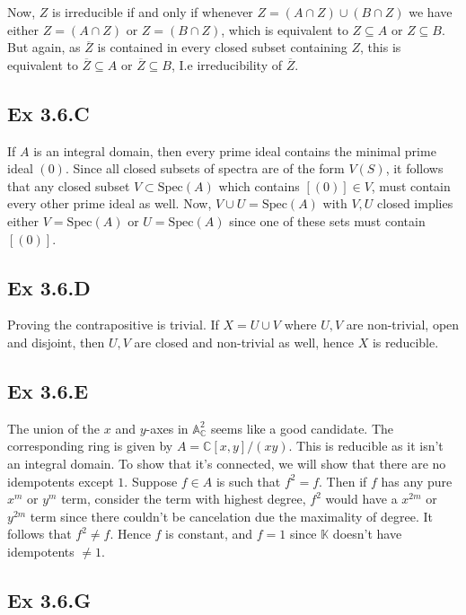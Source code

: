 \documentclass{article}
\theoremstyle{definition}
\newcommand{\C}{\mathbb{C}}
\newcommand{\K}{\mathbb{K}}
\newcommand{\A}{\mathbb{A}}
\newcommand{\Spec}{\text{Spec}}
\begin{document}
Now, $Z$ is irreducible if and only if whenever $Z = (A \cap Z) \cup (B \cap Z)$ 
we have either $Z = (A \cap Z)$ or $Z = (B \cap Z)$, which is equivalent to 
$Z \subseteq A$ or $Z \subseteq B$. But again, as $\overline{Z}$ is contained 
in every closed subset containing $Z$, this is equivalent to $\overline{Z} \subseteq A$ 
or $\overline{Z} \subseteq B$, I.e irreducibility of $\overline{Z}$.

\subsection*{Ex 3.6.C}

If $A$ is an integral domain, then every prime ideal contains the minimal prime
ideal $(0)$. Since all closed subsets of spectra are of the form $V(S)$, it
follows that any closed subset $V \subset \Spec(A)$ which contains $[(0)] \in
V$, must contain every other prime ideal as well. Now, $V \cup U = \Spec(A)$
with $V, U$ closed implies either $V = \Spec(A)$ or $U = \Spec(A)$ since one of
these sets must contain $[(0)]$.

\subsection*{Ex 3.6.D}

Proving the contrapositive is trivial. If $X = U \cup V$ where $U, V$ are
non-trivial, open and disjoint, then $U, V$ are closed and non-trivial as well,
hence $X$ is reducible.

\subsection*{Ex 3.6.E}

The union of the $x$ and $y$-axes in $\A^2_{\C}$ seems like a good candidate.
The corresponding ring is given by $A = \C[x, y]/(xy)$. This is reducible as it
isn't an integral domain. To show that it's connected, we will show that there
are no idempotents except $1$. Suppose $f \in A$ is such that $f^2 = f$. Then
if $f$ has any pure $x^m$ or $y^m$ term, consider the term with highest degree,
$f^2$ would have a $x^{2m}$ or $y^{2m}$ term since there couldn't be
cancelation due the maximality of degree. It follows that $f^2 \not = f$. Hence
$f$ is constant, and $f = 1$ since $\K$ doesn't have idempotents $\not = 1$.

\subsection*{Ex 3.6.G}
\end{document}

